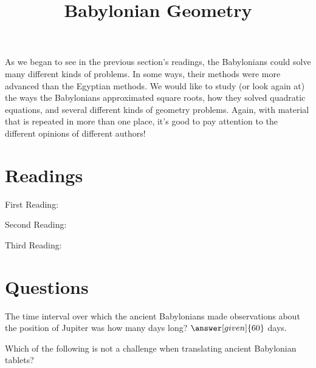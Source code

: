 \documentclass{ximera}
\title{Babylonian Geometry}
\begin{document}
\begin{abstract}
\end{abstract}
\maketitle

As we began to see in the previous section's readings, the Babylonians could solve many different kinds of problems. In some ways, their methods were more advanced than the Egyptian methods.  We would like to study (or look again at) the ways the Babylonians approximated square roots, how they solved quadratic equations, and several different kinds of geometry problems.  Again, with material that is repeated in more than one place, it's good to pay attention to the different opinions of different authors!




\section{Readings}

First Reading: 

Second Reading: 

Third Reading: 




\section{Questions}

\begin{question}
The time interval over which the ancient Babylonians made observations about the position of Jupiter was how many days long?  $\answer[given]{60}$ days.
\end{question}


\begin{question}
Which of the following is not a challenge when translating ancient Babylonian tablets?
\begin{multipleChoice}
\end{multipleChoice}
\end{question}


%
\end{document}

